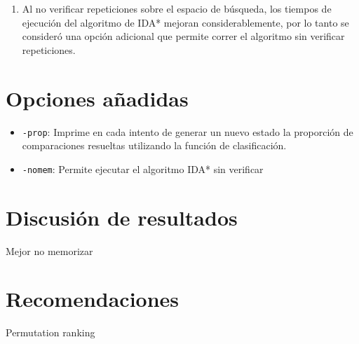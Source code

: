 \documentclass[letterpaper,12pt, titlepage]{article}
\newcommand{\ms}{\texttt}
\begin{document}
\begin{enumerate}
\item Al no verificar repeticiones sobre el espacio de búsqueda,
los tiempos de ejecución del algoritmo de IDA* mejoran considerablemente,
por lo tanto se consideró una opción adicional que permite correr el
algoritmo sin verificar repeticiones.
\end{enumerate}

\section{Opciones añadidas}

\begin{itemize}
\item \ms{-prop}: Imprime en cada intento de generar un nuevo estado
la proporción de comparaciones resueltas utilizando la función de
clasificación.

\item \ms{-nomem}: Permite ejecutar el algoritmo IDA* sin verificar

\end{itemize}

\section{Discusión de resultados}
Mejor no memorizar
\section{Recomendaciones}
Permutation ranking
\end{document}
